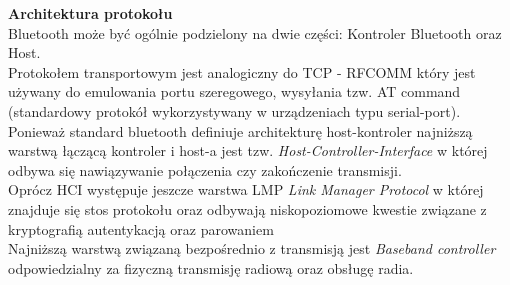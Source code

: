 \par 
\tab \textbf{Architektura protokołu} \\
Bluetooth może być ogólnie podzielony na dwie części: Kontroler Bluetooth oraz Host. \\
Protokołem transportowym jest analogiczny do TCP - RFCOMM który jest używany do emulowania portu szeregowego, wysyłania tzw. AT command (standardowy protokół wykorzystywany w urządzeniach typu serial-port). \\
Ponieważ standard bluetooth definiuje architekturę host-kontroler najniższą warstwą łączącą kontroler i host-a jest tzw.  \textit{Host-Controller-Interface} w której odbywa się nawiązywanie połączenia czy zakończenie transmisji. \\
Oprócz HCI występuje jeszcze warstwa LMP \textit{Link Manager Protocol} w której znajduje się stos protokołu oraz odbywają niskopoziomowe kwestie związane z kryptografią autentykacją oraz parowaniem \\
Najniższą warstwą związaną bezpośrednio z transmisją jest \textit{Baseband controller} odpowiedzialny za fizyczną transmisję radiową oraz obsługę radia.

\clearpage 